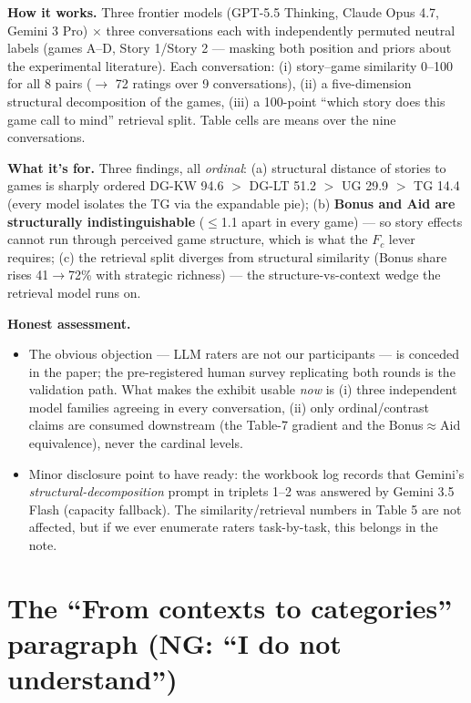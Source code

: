 \documentclass[11pt]{article}
\begin{document}
\textbf{How it works.} Three frontier models (GPT-5.5 Thinking, Claude Opus 4.7, Gemini 3 Pro) $\times$ three conversations each with independently permuted neutral labels (games A--D, Story 1/Story 2 --- masking both position and priors about the experimental literature). Each conversation: (i) story--game similarity 0--100 for all 8 pairs ($\to$ 72 ratings over 9 conversations), (ii) a five-dimension structural decomposition of the games, (iii) a 100-point ``which story does this game call to mind'' retrieval split. Table cells are means over the nine conversations.

\textbf{What it's for.} Three findings, all \emph{ordinal}: (a) structural distance of stories to games is sharply ordered DG-KW 94.6 $>$ DG-LT 51.2 $>$ UG 29.9 $>$ TG 14.4 (every model isolates the TG via the expandable pie); (b) \textbf{Bonus and Aid are structurally indistinguishable} ($\le$1.1 apart in every game) --- so story effects cannot run through perceived game structure, which is what the $F_c$ lever requires; (c) the retrieval split diverges from structural similarity (Bonus share rises 41$\to$72\% with strategic richness) --- the structure-vs-context wedge the retrieval model runs on.

\textbf{Honest assessment.}
\begin{itemize}
\item The obvious objection --- LLM raters are not our participants --- is conceded in the paper; the pre-registered human survey replicating both rounds is the validation path. What makes the exhibit usable \emph{now} is (i) three independent model families agreeing in every conversation, (ii) only ordinal/contrast claims are consumed downstream (the Table-7 gradient and the Bonus$\approx$Aid equivalence), never the cardinal levels.
\item Minor disclosure point to have ready: the workbook log records that Gemini's \emph{structural-decomposition} prompt in triplets 1--2 was answered by Gemini 3.5 Flash (capacity fallback). The similarity/retrieval numbers in Table 5 are not affected, but if we ever enumerate raters task-by-task, this belongs in the note.
\end{itemize}

\section{The ``From contexts to categories'' paragraph (NG: ``I do not understand'')}
\end{document}
